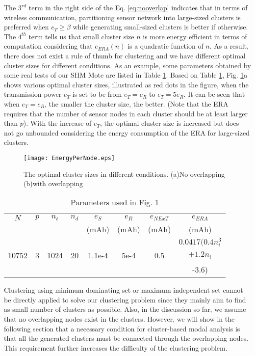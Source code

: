 The \(3^{rd}\) term in the right side of the Eq. \ref{eq:nooverlap} indicates that in terms of wireless communication, partitioning sensor network into large-sized clusters is preferred when \(e_T \geq \beta\) while generating small-sized clusters is better if otherwise. The \(4^{th}\) term tells us that small cluster size \(n\) is more energy efficient in terms of computation considering that \(e_{ERA}(n)\) is a quadratic function of \(n\). As a result, there does not exist a rule of thumb for clustering and we have different optimal cluster sizes for different conditions. As an example, some parameters obtained by some real tests of our SHM Mote are listed in Table \ref{tab:Table2}. Based on Table \ref{tab:Table2}, Fig. \ref{fig:MagicNumber2}a shows various optimal cluster sizes, illustrated as red dots in the figure, when the transmission power \(e_T\) is set to be from \(e_T = e_R\) to \(e_T = 5 e_R\). It can be seen that when \(e_T=e_R\), the smaller the cluster size, the better. (Note that the ERA requires that the number of sensor nodes in each cluster should be at least larger than \(p\)). With the increase of \(e_T\), the optimal cluster size is increased but does not go unbounded considering the energy consumption of the ERA for large-sized clusters.

\begin{figure}
	\centering
		\texttt{[image: EnergyPerNode.eps]}
	\caption{The optimal cluster sizes in different conditions. (a)No overlapping (b)with overlapping}
	\label{fig:MagicNumber2}
\end{figure}


\begin{table}
	\centering
\begin{tabular}{|c|c|c|c|c|c|c|c|}
\hline
\(N\)&\(p\)&\(n_t\)&\(n_d\)&\(e_S\)&\(e_R\)&\(e_{NExT}\)&\(e_{ERA}\)\\
& & & &(mAh)&(mAh)&(mAh)&(mAh)\\
\hline
     &     &       &       &       &   & &\(0.0417(0.4n_i^3\)\\
10752&3&1024&20&1.1e-4&5e-4&0.5&\(+1.2n_i\)\\
&&&&&&&-3.6)\\
\hline
\end{tabular}
	\caption{Parameters used in Fig. \ref{fig:MagicNumber2}}
	\label{tab:Table2}
\end{table}

Clustering using minimum dominating set \cite{wan2004distributed} or maximum independent set 
\cite{banerjee2001clustering} cannot be directly applied to solve our clustering problem since they mainly aim to find as small number of clusters as possible. Also, in the discussion so far, we assume that no overlapping nodes exist in the clusters. However, we will show in the following section that a necessary condition for cluster-based modal analysis is that all the generated clusters must be connected through the overlapping nodes. This requirement further increases the difficulty of the clustering problem.

